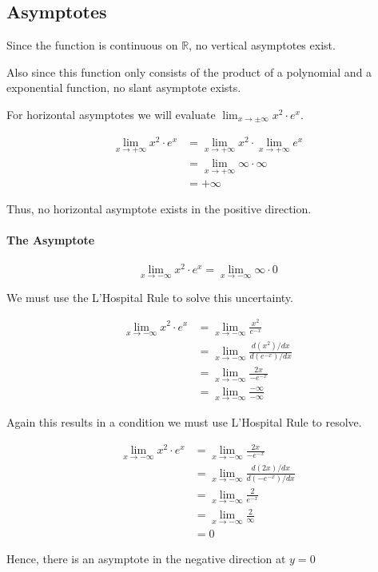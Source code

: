 \subsection{Asymptotes}

Since the function is continuous on \(\mathbb{R}\), no vertical asymptotes
exist.

Also since this function only consists of the product of a polynomial 
and a exponential function, no slant asymptote exists.

For horizontal asymptotes we will evaluate 
\(\lim_{x \rightarrow \pm\infty} {x^2\cdot e^x}\).

\[
    \begin{aligned}
        \lim_{x\rightarrow +\infty} {x^2 \cdot e^x} &
        = \lim_{x\rightarrow +\infty} {x^2} \cdot 
          \lim_{x\rightarrow +\infty} {e^x} \\
        & = \lim_{x\rightarrow +\infty} \infty \cdot \infty \\
        & = +\infty
    \end{aligned}
\]

Thus, no horizontal asymptote exists in the positive direction.

\paragraph{The Asymptote}
\[
    \lim_{x\rightarrow -\infty} {x^2 \cdot e^x}
    = \lim_{x\rightarrow -\infty} {\infty\cdot 0}
\]

We must use the L'Hospital Rule to solve this uncertainty.

\[
    \begin{aligned}
        \lim_{x\rightarrow -\infty} {x^2 \cdot e^x} &
        = \lim_{x\rightarrow -\infty} \frac{x^2}{e^{-x}} \\
        & = \lim_{x\rightarrow -\infty} 
                \frac{ {d(x^2)} / {dx}}
                     { {d(e^{-x})} / {dx}} \\
        & = \lim_{x\rightarrow -\infty}
                \frac{ 2x }
                     { -e^{-x} } \\
        & = \lim_{x\rightarrow -\infty}
                \frac{-\infty}{-\infty}
    \end{aligned}
\]

Again this results in a condition we must use L'Hospital Rule to resolve.

\[
    \begin{aligned}
        \lim_{x\rightarrow -\infty} {x^2 \cdot e^x} &
        = \lim_{x\rightarrow -\infty}
                \frac{ 2x }
                     { -e^{-x} } \\
        & = \lim_{x\rightarrow -\infty}
                 \frac{d(2x)/dx}
                      {d(-e^{-x})/dx} \\
        & = \lim_{x\rightarrow -\infty}
                 \frac{2}
                      {e^{-x}} \\
        & = \lim_{x\rightarrow -\infty}
                \frac{2}
                     {\infty} \\
        & = 0
    \end{aligned}
\]

Hence, there is an asymptote in the negative direction at \(y = 0\)